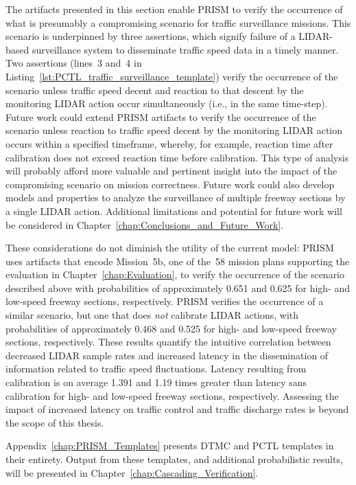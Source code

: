 The artifacts presented in this section enable PRISM to verify the occurrence of what is presumably a compromising scenario for traffic surveillance missions. This scenario is underpinned by three assertions, which signify failure of a LIDAR-based surveillance system to disseminate traffic speed data in a timely manner. Two assertions (lines~3 and~4 in Listing~\ref{lst:PCTL_traffic_surveillance_template}) verify the occurrence of the scenario unless traffic speed decent and reaction to that descent by the monitoring LIDAR action occur simultaneously (i.e., in the same time-step). Future work could extend PRISM artifacts to verify the occurrence of the scenario unless reaction to traffic speed decent by the monitoring LIDAR action occurs within a specified timeframe, whereby, for example, reaction time after calibration does not exceed reaction time before calibration. This type of analysis will probably afford more valuable and pertinent insight into the impact of the compromising scenario on mission correctness. Future work could also develop models and properties to analyze the surveillance of multiple freeway sections by a single LIDAR action. Additional limitations and potential for future work will be considered in Chapter~\ref{chap:Conclusions_and_Future_Work}.

These considerations do not diminish the utility of the current model: PRISM uses artifacts that encode Mission~5b, one of the~58 mission plans supporting the evaluation in Chapter~\ref{chap:Evaluation}, to verify the occurrence of the scenario described above with probabilities of approximately 0.651 and 0.625 for high- and low-speed freeway sections, respectively. PRISM verifies the occurrence of a similar scenario, but one that does \emph{not} calibrate LIDAR actions, with probabilities of approximately 0.468 and 0.525 for high- and low-speed freeway sections, respectively. These results quantify the intuitive correlation between decreased LIDAR sample rates and increased latency in the dissemination of information related to traffic speed fluctuations. Latency resulting from calibration is on average 1.391 and 1.19 times greater than latency sans calibration for high- and low-speed freeway sections, respectively. Assessing the impact of increased latency on traffic control and traffic discharge rates is beyond the scope of this thesis.

Appendix~\ref{chap:PRISM_Templates} presents DTMC and PCTL templates in their entirety. Output from these templates, and additional probabilistic results, will be presented in Chapter~\ref{chap:Cascading_Verification}.

